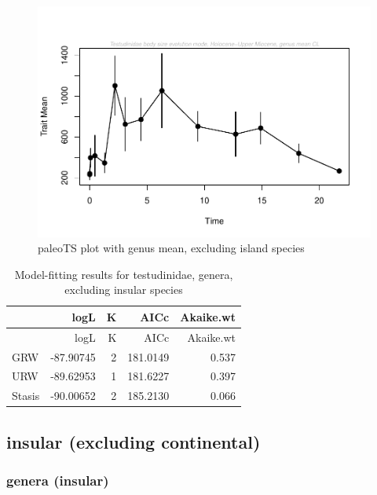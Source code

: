 \documentclass[]{article}
\begin{document}
\begin{figure}[htbp]
\centering
\includegraphics{MA_JJ_files/figure-latex/paleoTS plot with genus mean, excluding island species-1.pdf}
\caption{paleoTS plot with genus mean, excluding island species}
\end{figure}

\begin{longtable}[]{@{}lrrrr@{}}
\caption{Model-fitting results for testudinidae, genera, excluding
insular species}\tabularnewline
\toprule
& logL & K & AICc & Akaike.wt\tabularnewline
\midrule
\endfirsthead
\toprule
& logL & K & AICc & Akaike.wt\tabularnewline
\midrule
\endhead
GRW & -87.90745 & 2 & 181.0149 & 0.537\tabularnewline
URW & -89.62953 & 1 & 181.6227 & 0.397\tabularnewline
Stasis & -90.00652 & 2 & 185.2130 & 0.066\tabularnewline
\bottomrule
\end{longtable}

\newpage

\subsection{insular (excluding
continental)}\label{insular-excluding-continental}

\subsubsection{genera (insular)}\label{genera-insular}
\end{document}

